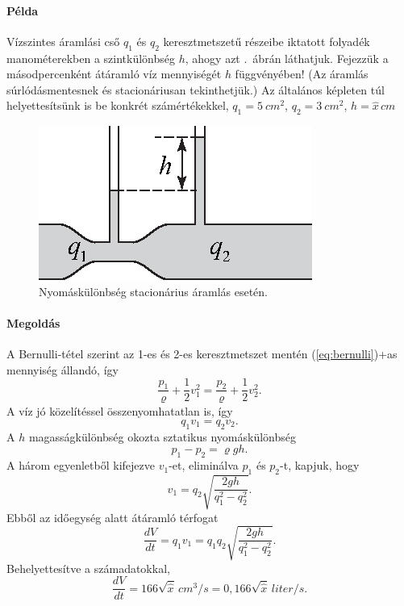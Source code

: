 \documentclass[12pt,a4paper]{scrartcl}
\begin{document}
\footnotesize
\paragraph{Példa}
Vízszintes áramlási cső $q_1$ és $q_2$ keresztmetszetű részeibe iktatott folyadék manométerekben a szintkülönbség $h$, ahogy azt .\ ábrán láthatjuk. Fejezzük a másodpercenként átáramló víz mennyiségét $h$ függvényében! (Az áramlás súrlódásmentesnek és stacionáriusan tekinthetjük.) Az általános képleten túl helyettesítsünk is be konkrét számértékekkel, $q_1 = \SI{5}{cm^2}$, $q_2 = \SI{3}{cm^2}$, $h={\hat x}\,\si{cm}$

\begin{figure}[htb] 
\centering    
\includegraphics[scale=1]{figs/bernoulli_pelda.eps}
\caption{Nyomáskülönbség stacionárius áramlás esetén.}
\label{fig:bernoulli}
\end{figure}
\FloatBarrier

\paragraph{Megoldás}

A Bernulli-tétel szerint az 1-es és 2-es keresztmetszet mentén \atold(\ref{eq:bernulli})+as{} mennyiség állandó, így 
\[\frac{{{p_1}}}{\varrho } + \frac{1}{2}v_1^2 = \frac{{{p_2}}}{\varrho } + \frac{1}{2}v_2^2.\]
A víz jó közelítéssel összenyomhatatlan is, így 
\[{q_1}{v_1} = {q_2}{v_2}.\]
A $h$ magasságkülönbség okozta sztatikus nyomáskülönbség
\[{p_1} - {p_2} = \varrho gh.\]
A három egyenletből kifejezve $v_1$-et, eliminálva $p_1$ és $p_2$-t, kapjuk, hogy 
\[{v_1} = {q_2}\sqrt {\frac{{2gh}}{{q_1^2 - q_2^2}}}.\]
Ebből az időegység alatt átáramló térfogat
\[\frac{{dV}}{{dt}} = {q_1}{v_1} = {q_1}{q_2}\sqrt {\frac{{2gh}}{{q_1^2 - q_2^2}}} .\]
Behelyettesítve a számadatokkal, 
\[\frac{{dV}}{{dt}} = 166\sqrt {\hat x}\,\si{cm^3/s} = 0{,}166\sqrt{{\hat x}}\,\si{liter/s}.\]
\normalsize
\end{document}
